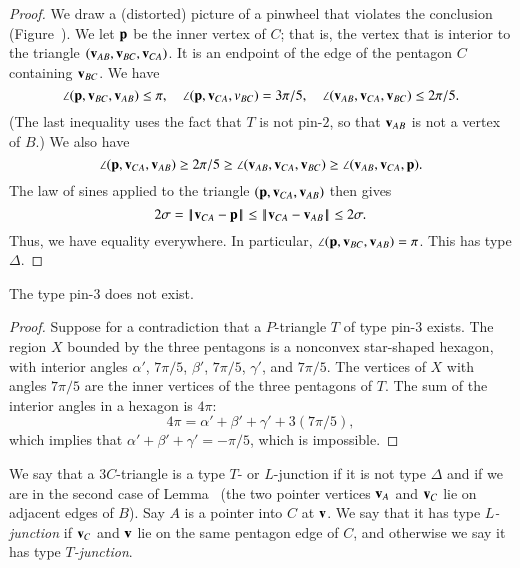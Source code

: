 \begin{proof}  We draw a (distorted) picture of a
  pinwheel that violates the conclusion (Figure~).
  We let ${\mathbf p}$ be the inner vertex of $C$; that is, the vertex that is
  interior to the triangle $({\mathbf v}_{AB},{\mathbf v}_{BC},{\mathbf v}_{CA})$.  It is an
  endpoint of the edge of the pentagon $C$ containing ${\mathbf v}_{BC}$.  We have
\[
\angle ({\mathbf p},{\mathbf v}_{BC},{\mathbf v}_{AB}) \le \pi,\quad \angle({\mathbf p},{\mathbf v}_{CA},v_{BC}) = 3\pi/5,\quad
\angle({\mathbf v}_{AB},{\mathbf v}_{CA},{\mathbf v}_{BC})\le 2\pi/5.
\]
(The last inequality uses the fact that $T$ is not pin-$2$, so
that ${\mathbf v}_{AB}$ is not a vertex of $B$.)
We also have
\[
\angle({\mathbf p},{\mathbf v}_{CA},{\mathbf v}_{AB}) \ge 2\pi /5 \ge \angle({\mathbf v}_{AB},{\mathbf v}_{CA},{\mathbf v}_{BC}) \ge \angle({\mathbf v}_{AB},{\mathbf v}_{CA},{\mathbf p}).
\]
The law of sines applied to the triangle $({\mathbf p},{\mathbf v}_{CA},{\mathbf v}_{AB})$ then gives
\[
2\sigma =\norm{\v_{CA}}{\p}\le\norm{\v_{CA}}{\v_{AB}}\le 2\sigma.
\]
Thus, we have equality everywhere.  In particular, $\angle({\mathbf p},{\mathbf v}_{BC},{\mathbf v}_{AB})=\pi$.  This
has type $\Delta$.
\end{proof}

\begin{lemma}  The type pin-$3$ does not exist.  
\end{lemma}

\begin{proof} Suppose for a contradiction that a $P$-triangle $T$ of
  type pin-$3$ exists.  The region $X$ bounded by the three pentagons
  is a nonconvex star-shaped hexagon, with interior angles $\alpha'$,
  $7\pi/5$, $\beta'$, $7\pi/5$, $\gamma'$, and $7\pi/5$.  The vertices
  of $X$ with angles $7\pi/5$ are the inner vertices of the three
  pentagons of $T$.  The sum of the interior angles in a hexagon is $4\pi$:
\[
4\pi = \alpha'+\beta'+\gamma' + 3 (7\pi/5),
\]
which implies that $\alpha'+\beta'+\gamma' = -\pi/5$, which is
impossible.
\end{proof}

\begin{definition}
  We say that a $3C$-triangle is a type $T$- or $L$-junction if it is
  not type $\Delta$ and if we are in the second case of
  Lemma~ (the two pointer vertices ${\mathbf v}_A$ and ${\mathbf v}_C$
  lie on adjacent edges of $B$).  Say $A$ is a pointer into $C$ at
  ${\mathbf v}$.  We say that it has type {\it $L$-junction} if ${\mathbf v}_C$ and ${\mathbf v}$
  lie on the same pentagon edge of $C$, and otherwise we say it has
  type {\it $T$-junction}.
\end{definition}

